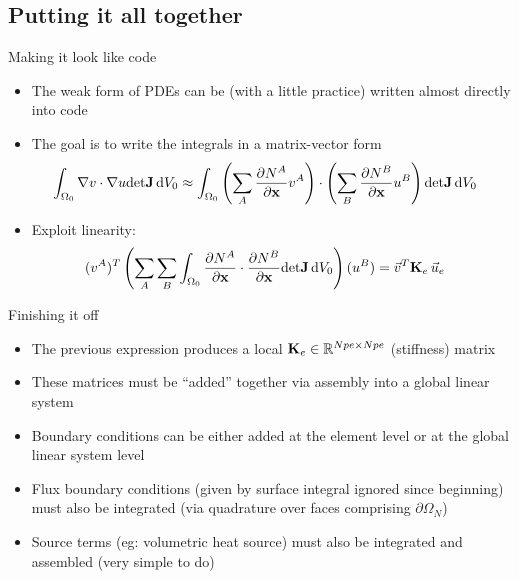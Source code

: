 \subsection{Putting it all together}
\begin{frame}{Making it look like code}
  \begin{itemize}
  \item
    The weak form of PDEs can be (with a little practice) written
    almost directly into code
  \item
    The goal is to write the integrals in a matrix-vector form
    \begin{align*}
      \int_{\Omega_0} \nabla v \cdot \nabla u \mathrm{det}\mathbf{J}\,\mathrm{d}V_0 &\approx
      \int_{\Omega_0} \left(\sum_A \frac{\partial N^A}{\partial \mathbf{x}} v^A\right) 
      \cdot \left(\sum_B \frac{\partial N^B}{\partial \mathbf{x}} u^B\right) 
      \mathrm{det}\mathbf{J}\,\mathrm{d}V_0
    \end{align*}
  \item
    Exploit linearity:
    \begin{align*}
      (v^A)^T\left(\sum_A \sum_B \int_{\Omega_0} \frac{\partial N^A}{\partial \mathbf{x}} 
      \cdot \frac{\partial N^B}{\partial \mathbf{x}}
      \mathrm{det}\mathbf{J}\,\mathrm{d}V_0 \right) (u^B)
      &= \vec{v}^T \mathbf{K}_e \,\vec{u}_e
    \end{align*}
  \end{itemize}
\end{frame}


\begin{frame}{Finishing it off}
  \begin{itemize}
  \item
    The previous expression produces a local $\mathbf{K}_e \in \mathbb{R}^{Npe\times Npe}$ (stiffness) matrix
  \item
    These matrices must be ``added'' together via assembly into a global linear system
  \item
    Boundary conditions can be either added at the element level or at the global
    linear system level
  \item
    Flux boundary conditions (given by surface integral ignored since beginning)
    must also be integrated (via quadrature over faces comprising $\partial \Omega_N$)
  \item
    Source terms (eg: volumetric heat source) must also be integrated 
    and assembled (very simple to do)
  \end{itemize}
\end{frame}
